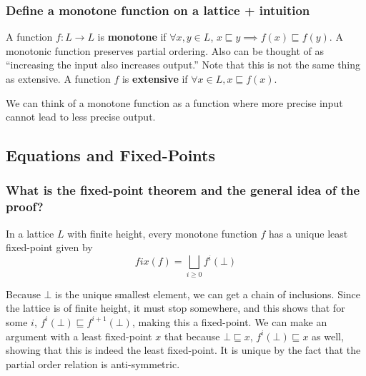 \documentclass[11pt]{article}
\begin{document}
\subsubsection{Define a monotone function on a lattice + intuition}
A function $f: L \to L$ is \textbf{monotone} if $\forall x,y \in L$, $x \sqsubseteq y \implies f(x) \sqsubseteq f(y)$. A monotonic function preserves partial ordering. Also can be thought of as ``increasing the input also increases output.'' Note that this is not the same thing as extensive. A function $f$ is \textbf{extensive} if $\forall x \in L, x \sqsubseteq f(x)$.

We can think of a monotone function as a function where more precise input cannot lead to less precise output.

\subsection{Equations and Fixed-Points}
\subsubsection{What is the fixed-point theorem and the general idea of the proof?}
\begin{theorem}
    In a lattice $L$ with finite height, every monotone function $f$ has a unique least fixed-point given by
    \[fix(f) = \bigsqcup_{i \geq 0} f^i (\bot)\]
\end{theorem}
\begin{proof-idea}
Because $\bot$ is the unique smallest element, we can get a chain of inclusions. Since the lattice is of finite height, it must stop somewhere, and this shows that for some $i$, $f^i(\bot) \sqsubseteq f^{i+1}(\bot)$, making this a fixed-point. We can make an argument with a least fixed-point $x$ that because $\bot \sqsubseteq x$, $f^i(\bot) \sqsubseteq x$ as well, showing that this is indeed the least fixed-point. It is unique by the fact that the partial order relation is anti-symmetric.
\end{proof-idea}

\end{document}
